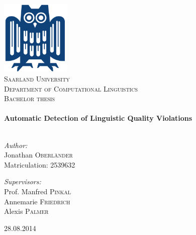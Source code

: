 \begin{titlepage}
\begin{center}

\includegraphics[width=0.25\textwidth]{./eule}~\\[1cm]

\textsc{\LARGE Saarland  University}\\[0.4cm]
\textsc{\Large Department of Computational Linguistics}\\[1.5cm]

\textsc{\Large Bachelor thesis}\\[0.5cm]


\HRule \\[1.0cm]

{ \huge \bfseries Automatic Detection of Linguistic Quality Violations}\\[0.4cm]

\HRule \\[1.5cm]

\begin{minipage}{0.4\textwidth}
\begin{flushleft} \large
\emph{Author:}\\
Jonathan \textsc{Oberländer}\\
Matriculation: 2539632
\end{flushleft}
\end{minipage}
\begin{minipage}{0.4\textwidth}
\begin{flushright} \large
\emph{Supervisors:} \\
Prof. Manfred \textsc{Pinkal}\\
Annemarie \textsc{Friedrich}\\
Alexis \textsc{Palmer}\\
\end{flushright}
\end{minipage}

\vfill

{\large 28.08.2014}

\end{center}
\end{titlepage}
